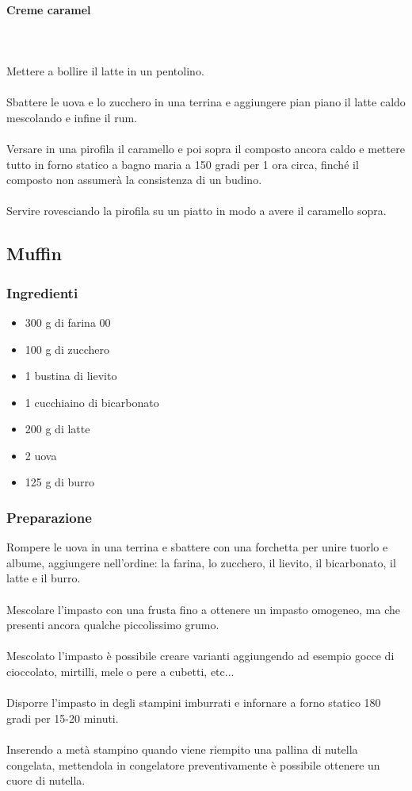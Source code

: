 \documentclass[12pt, a4paper]{article}
\begin{document}
	\paragraph{Creme caramel}\mbox{}\\\\
	Mettere a bollire il latte in un pentolino.\\\\
	Sbattere le uova e lo zucchero in una terrina e aggiungere pian piano il
	latte caldo mescolando e infine il rum.\\\\
	Versare in una pirofila il caramello e poi sopra il composto ancora caldo e
	mettere tutto in forno statico a bagno maria a 150 gradi per 1 ora circa, finché
	il composto non assumerà la consistenza di un budino.\\\\
	Servire rovesciando la pirofila su un piatto in modo a avere il caramello sopra.
\clearpage

\subsection{Muffin}

\subsubsection{Ingredienti}
\begin{itemize}
\item   300 g di farina 00
\item	100 g di zucchero
\item	1 bustina di lievito
\item	1 cucchiaino di bicarbonato
\item	200 g di latte
\item	2 uova
\item	125 g di burro
\end{itemize}

\subsubsection{Preparazione}
	Rompere le uova in una terrina e sbattere con una forchetta per unire tuorlo e 
	albume, aggiungere nell'ordine: la farina, lo zucchero, il lievito, il bicarbonato,
	il latte e il burro.\\\\
	Mescolare l'impasto con una frusta fino a ottenere un impasto omogeneo, ma che
	presenti ancora qualche piccolissimo grumo.\\\\
	Mescolato l'impasto è possibile creare varianti aggiungendo ad esempio gocce di
	cioccolato, mirtilli, mele o pere a cubetti, etc...\\\\
	Disporre l'impasto in degli stampini imburrati e infornare a forno statico 180
	gradi per 15-20 minuti.\\\\
	Inserendo a metà stampino quando viene riempito una pallina di nutella congelata,
	mettendola in congelatore preventivamente è possibile ottenere un cuore di nutella.
	
\end{document}

